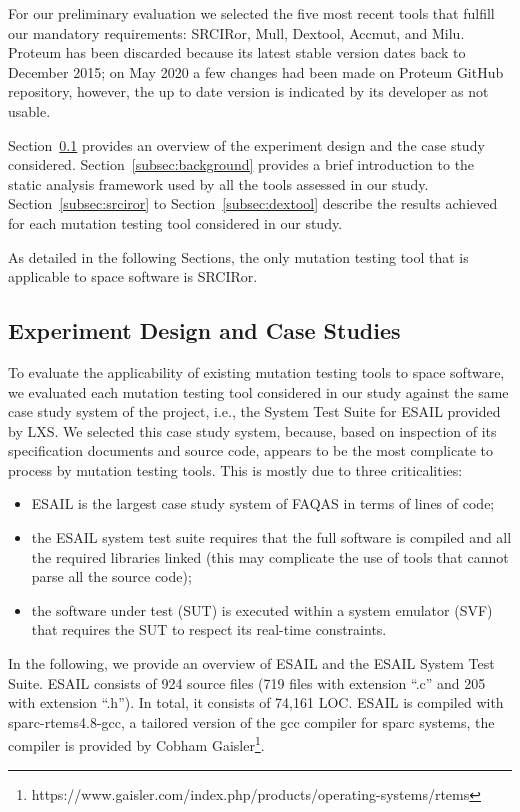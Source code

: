 For our preliminary evaluation we selected the five most recent tools that fulfill our mandatory requirements: SRCIRor, Mull, Dextool, Accmut, and Milu. Proteum has been discarded because its latest stable version dates back to December 2015; on May 2020 a few changes had been made on Proteum GitHub repository, however, the up to date version is indicated by its developer as not usable.

Section~\ref{subsec:experiment_design} provides an overview of the experiment design and the case study considered. 
Section~\ref{subsec:background} provides a brief introduction to the static analysis framework used by all the tools assessed in our study.
Section~\ref{subsec:srciror} to Section~\ref{subsec:dextool} describe the results achieved for each mutation testing tool considered in our study.

As detailed in the following Sections, the only mutation testing tool that is applicable to space software is SRCIRor.

\subsection{Experiment Design and Case Studies}
\label{subsec:experiment_design}




To evaluate the applicability of existing mutation testing tools to space software, we evaluated each mutation testing tool considered in our study against the same case study system of the project, i.e., the System Test Suite for ESAIL provided by LXS. We selected this case study system, because, based on inspection of its specification documents and source code, appears to be the most complicate to process by mutation testing tools. This is mostly due to three criticalities:

\begin{itemize}
	\item ESAIL is the largest case study system of FAQAS in terms of lines of code;
	\item the ESAIL system test suite requires that the full software is compiled and all the required libraries linked (this may complicate the use of tools that cannot parse all the source code);
	\item the software under test (SUT) is executed within a system emulator (SVF) that requires the SUT to respect its real-time constraints.
\end{itemize}

In the following, we provide an overview of ESAIL and the ESAIL System Test Suite. ESAIL consists of 924 source files (719 files with extension ``.c'' and 205 with extension ``.h''). In total, it consists of 74,161 LOC. ESAIL is compiled with sparc-rtems4.8-gcc, a tailored version of the gcc compiler for sparc systems, the compiler is provided by Cobham Gaisler\footnote{https://www.gaisler.com/index.php/products/operating-systems/rtems}.

